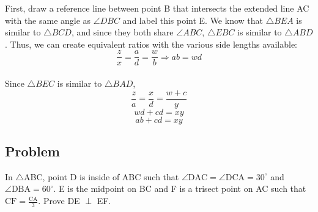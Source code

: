 \documentclass{article}
\begin{document}
\begin{center}
\begin{tikzpicture}[x=0.75pt,y=0.75pt,yscale=-1.6,xscale=1.6]
\end{tikzpicture}
\end{center}

First, draw a reference line between point B that intersects the extended line AC with the same angle as $\angle DBC$ and label this point E. We know that $\triangle BEA$ is similar to $\triangle BCD$, and since they both share $\angle ABC$, $\triangle EBC$ is similar to $\triangle ABD$. Thus, we can create equivalent ratios with the various side lengths available:
$$\frac{z}{x}=\frac{a}{d}=\frac{w}{b}\Longrightarrow ab=wd$$\\
Since $\triangle BEC$ is similar to $\triangle BAD$,
$$\frac{z}{a}=\frac{x}{d}=\frac{w+c}{y}$$
$$wd+cd=xy$$
$$ab+cd=xy$$


\pagebreak

\subsection{Problem}
In \(\triangle\)ABC, point D is inside of ABC such that \(\angle \mathrm{DAC} = \angle \mathrm{DCA}=30^{\circ} \) and \(\angle \mathrm{DBA}=60^{\circ}\). E is the midpoint on BC and F is a trisect point on AC such that \(\mathrm{CF} = \frac{\mathrm{CA}}{3} \). Prove DE \(\perp\) EF.



\end{document}
